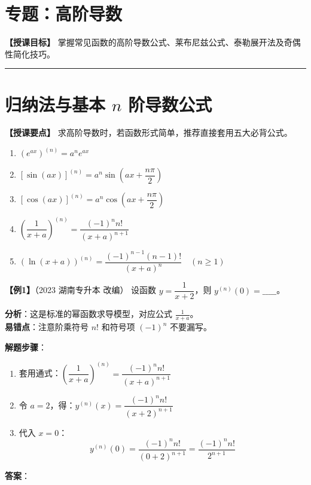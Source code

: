 \documentclass[12pt,a4paper]{article}
\begin{document}
\section*{专题：高阶导数}

\textbf{【授课目标】} 掌握常见函数的高阶导数公式、莱布尼兹公式、泰勒展开法及奇偶性简化技巧。

\rule{\linewidth}{0.5pt}

\section{归纳法与基本 $n$ 阶导数公式}

\textbf{【授课要点】}
求高阶导数时，若函数形式简单，推荐直接套用五大必背公式。

\begin{tcolorbox}[title=\textbf{★ 必背公式表 (建议板书)}, colback=white, colframe=black]
\begin{enumerate}[label=\arabic*)]
    \item $(e^{ax})^{(n)} = a^n e^{ax}$
    \item $[\sin(ax)]^{(n)} = a^n \sin\left(ax + \dfrac{n\pi}{2}\right)$
    \item $[\cos(ax)]^{(n)} = a^n \cos\left(ax + \dfrac{n\pi}{2}\right)$
    \item $\left(\dfrac{1}{x+a}\right)^{(n)} = \dfrac{(-1)^n n!}{(x+a)^{n+1}}$
    \item $(\ln(x+a))^{(n)} = \dfrac{(-1)^{n-1} (n-1)!}{(x+a)^n} \quad (n \geq 1)$
\end{enumerate}
\end{tcolorbox}

\vspace{1em}

\textbf{【例1】}（2023 湖南专升本 改编）
设函数 $y = \dfrac{1}{x+2}$，则 $y^{(n)}(0) = \_\_\_\_\_$。

\begin{tiptip}
\textbf{分析}：这是标准的幂函数求导模型，对应公式 $\frac{1}{x+a}$。\\
\textbf{易错点}：注意阶乘符号 $n!$ 和符号项 $(-1)^n$ 不要漏写。
\end{tiptip}

\textbf{解题步骤}：
\begin{enumerate}
    \item 套用通式：$\left( \dfrac{1}{x+a} \right)^{(n)} = \dfrac{(-1)^n n!}{(x+a)^{n+1}}$
    \item 令 $a=2$，得：$y^{(n)}(x) = \dfrac{(-1)^n n!}{(x+2)^{n+1}}$
    \item 代入 $x=0$：
    \[
    y^{(n)}(0) = \dfrac{(-1)^n n!}{(0+2)^{n+1}} = \dfrac{(-1)^n n!}{2^{n+1}}
    \]
\end{enumerate}
\textbf{答案}：
\end{document}
